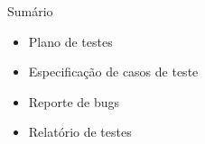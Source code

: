 
\begin{frame}{Sumário}
    \begin{itemize}
        \item Plano de testes
        \item Especificação de casos de teste
        \item Reporte de bugs
        \item Relatório de testes
    \end{itemize}
\end{frame}